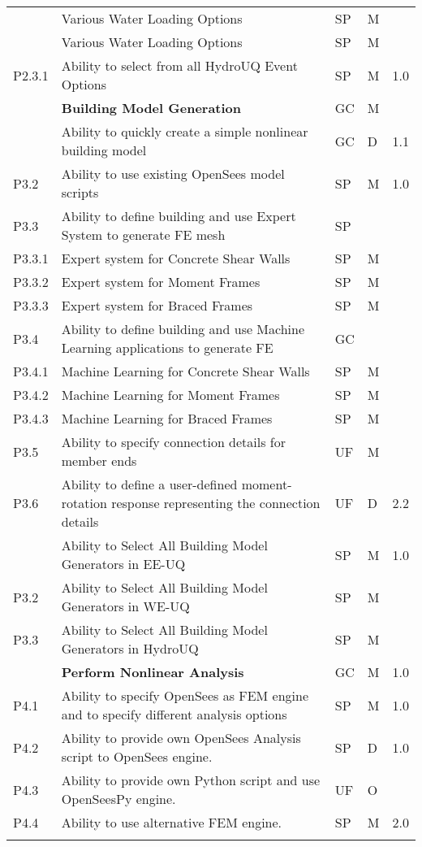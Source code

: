 \begin{longtable}{| p{} | p{} | p{} | p{} |  p{} |}
 \softwareSwitch{PBE}{ 
 P2.3 & Various Water Loading Options & SP & M &   \\ \hhline{=====}
 } {
 P2.3 & Various Water Loading Options & SP & M &   \\ \hline
 P2.3.1 & Ability to select from all HydroUQ Event Options & SP & M & 1.0  \\ \hhline{=====}
 }
 
 
 P3 & \textbf{Building Model Generation} & GC & M &  \\ \hline
  \softwareSwitch{PBE}{ 
  P3.1 & Ability to quickly create a simple nonlinear building model & GC & D & 1.1 \\ \hline
  P3.2 & Ability to use existing OpenSees model scripts & SP & M & 1.0 \\ \hline
  P3.3  & Ability to define building and use Expert System to generate FE mesh & SP & &  \\ \hline
  P3.3.1 & Expert system for Concrete Shear Walls & SP & M &  \\ \hline
  P3.3.2 & Expert system for Moment Frames & SP & M &  \\ \hline
  P3.3.3 & Expert system for  Braced Frames & SP & M &   \\ \hline
  P3.4 & Ability to define building and use Machine Learning applications to generate FE & GC &  &  \\ \hline
  P3.4.1 & Machine Learning for Concrete Shear Walls & SP & M &  \\ \hline
  P3.4.2 & Machine Learning for Moment Frames & SP & M &  \\ \hline
  P3.4.3 & Machine Learning for Braced Frames & SP & M &   \\ \hline
  P3.5 & Ability to specify connection details for member ends & UF & M &  \\ \hline
  P3.6 & Ability to define a user-defined moment-rotation response representing the connection details & UF & D & 2.2 \\ \hhline{=====}
  } {  
 P3.1 & Ability to Select All Building Model Generators in EE-UQ & SP & M & 1.0 \\ \hhline
 P3.2 & Ability to Select All Building Model Generators in WE-UQ & SP & M &  \\ \hhline
 P3.3 & Ability to Select All Building Model Generators in HydroUQ & SP & M &  \\ \hhline{=====}
  }
 

  P4 & \textbf{Perform Nonlinear Analysis} & GC & M & 1.0 \\ \hline
  P4.1 & Ability to specify OpenSees as FEM engine and to specify different analysis options & SP & M & 1.0 \\ \hline
  P4.2 & Ability to provide own OpenSees Analysis script to OpenSees engine. & SP & D & 1.0 \\ \hline
  P4.3 & Ability to provide own Python script and use OpenSeesPy engine. & UF & O &  \\ \hline
  P4.4 & Ability to use alternative FEM engine. & SP & M & 2.0 \\ \hhline{=====}
  

\end{longtable}
